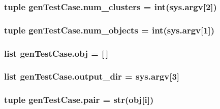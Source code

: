 \hypertarget{namespacegenTestCase_a0fe831ca87bbbde19c8e0145cc350cc5}{
\subsubsection[{num\-\_\-clusters}]{\setlength{\rightskip}{0pt plus 5cm}tuple gen\-Test\-Case.\-num\-\_\-clusters = int(sys.\-argv\mbox{[}2\mbox{]})}}\label{namespacegenTestCase_a0fe831ca87bbbde19c8e0145cc350cc5}
\hypertarget{namespacegenTestCase_aae9a7a96491ccd585c9d67ee2aff7387}{
\subsubsection[{num\-\_\-objects}]{\setlength{\rightskip}{0pt plus 5cm}tuple gen\-Test\-Case.\-num\-\_\-objects = int(sys.\-argv\mbox{[}1\mbox{]})}}\label{namespacegenTestCase_aae9a7a96491ccd585c9d67ee2aff7387}
\hypertarget{namespacegenTestCase_ad5562d57d874cb6070897a29f65a5f89}{
\subsubsection[{obj}]{\setlength{\rightskip}{0pt plus 5cm}list gen\-Test\-Case.\-obj = \mbox{[}$\,$\mbox{]}}}\label{namespacegenTestCase_ad5562d57d874cb6070897a29f65a5f89}
\hypertarget{namespacegenTestCase_aa8a0b42d363ab3e8c59ab0514e6a4f21}{
\subsubsection[{output\-\_\-dir}]{\setlength{\rightskip}{0pt plus 5cm}list gen\-Test\-Case.\-output\-\_\-dir = sys.\-argv\mbox{[}3\mbox{]}}}\label{namespacegenTestCase_aa8a0b42d363ab3e8c59ab0514e6a4f21}
\hypertarget{namespacegenTestCase_a7222cb3c4de837afb0a128f5841711a4}{
\subsubsection[{pair}]{\setlength{\rightskip}{0pt plus 5cm}tuple gen\-Test\-Case.\-pair = str({\bf obj}\mbox{[}i\mbox{]})}}\label{namespacegenTestCase_a7222cb3c4de837afb0a128f5841711a4}

